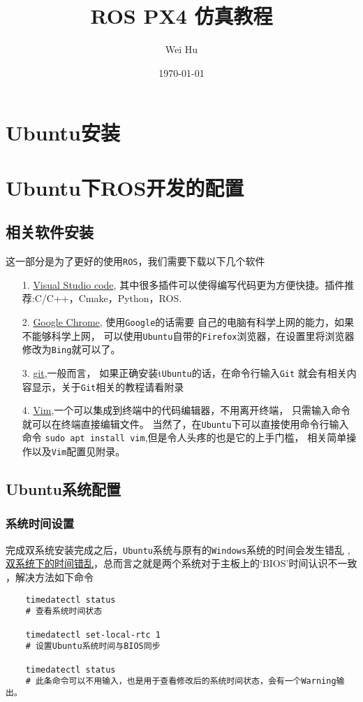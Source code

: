 \documentclass[UTF8]{article}
\begin{document}
\author{Wei Hu}
\date{\today}
\title{\textbf{ROS PX4 仿真教程}}
\maketitle
\tableofcontents
\section{Ubuntu安装}
\section{Ubuntu下ROS开发的配置}
\subsection{相关软件安装}
这一部分是为了更好的使用\texttt{ROS}，我们需要下载以下几个软件
\begin{itemize}
    \item [1.]\href{https://code.visualstudio.com/download}{Visual Studio code},
          其中很多插件可以使得编写代码更为方便快捷。插件推荐:C/C++，Cmake，Python，ROS.
    \item [2.]\href{https://www.google.com/chrome/}{Google Chrome},
          使用\texttt{Google}的话需要
          自己的电脑有科学上网的能力，如果不能够科学上网，
          可以使用\texttt{Ubuntu}自带的\texttt{Firefox}浏览器，在设置里将浏览器修改为\texttt{Bing}就可以了。
    \item [3.]\href{https://git-scm.com/downloads}{git},一般而言，
          如果正确安装t\texttt{Ubuntu}的话，在命令行输入\texttt{Git}
          就会有相关内容显示，关于\texttt{Git}相关的教程请看附录
    \item [4.]\href{https://www.vim.org/download.php}{Vim},一个可以集成到终端中的代码编辑器，不用离开终端，
          只需输入命令就可以在终端直接编辑文件。
          当然了，在\texttt{Ubuntu}下可以直接使用命令行输入命令
          \texttt{sudo apt install vim},但是令人头疼的也是它的上手门槛，
          相关简单操作以及\texttt{Vim}配置见附录。
\end{itemize}
\subsection{Ubuntu系统配置}
\subsubsection{系统时间设置}
完成双系统安装完成之后，\texttt{Ubuntu}系统与原有的\texttt{Windows}系统的时间会发生错乱
,\href{URLhttps://zhuanlan.zhihu.com/p/492885761}{双系统下的时间错乱}，总而言之就是两个系统对于主板上的`BIOS'时间认识不一致
，解决方法如下命令
\begin{verbatim}
    timedatectl status 
    # 查看系统时间状态

    timedatectl set-local-rtc 1 
    # 设置Ubuntu系统时间与BIOS同步
    
    timedatectl status 
    # 此条命令可以不用输入，也是用于查看修改后的系统时间状态，会有一个Warning输出。
\end{verbatim}
\end{document}
